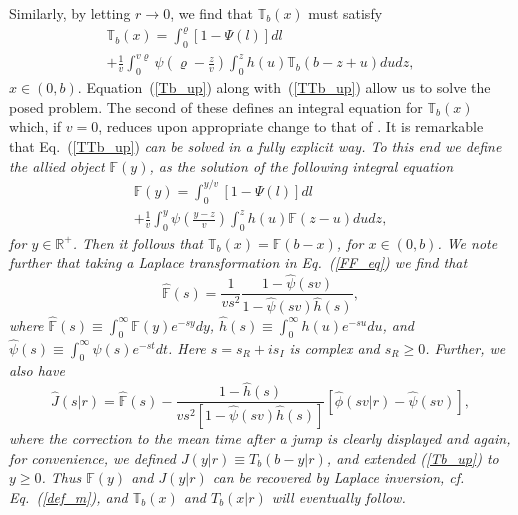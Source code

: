 \documentclass[english,aps,a4paper,twocolumn,showpacs,showkeys,amsfonts,amsmath,amssymb,amscd,nofootinbib]{revtex4}
\newcommand{\1}{\'\i}
\newcommand{\TT}{\mathbb{T}}\newcommand{\FF}{\mathbb{F}}
\newcommand{\RR}{\mathbb{R}}
\def\eq{\equiv}
\begin{document}
 Similarly, by
 letting %
 $r\to 0$, we find that
 $\TT_b(x)$ must satisfy
\begin{eqnarray}
\TT_b(x)= \int^{\varrho}_{0}\left[1-\Psi(l)\right]d  l  \nonumber \\
+\frac{1}{v}\int^{v \varrho}_{0}
\psi\left(\varrho-\frac{z}{v}\right) \int^{z}_{0} h(u)
\TT_b\left(b-z+u\right)d  ud  z, \label{TTb_up}%
\end{eqnarray}
$x\in(0,b)$. Equation~(\ref{Tb_up})  along with~(\ref{TTb_up})  allow us to solve
the posed problem. The second of these
  defines an  integral equation for $\TT_b(x)$ which, if $v=0$,
 reduces upon appropriate change to that  of  \cite{mmp05,mmpw06}.
  It is remarkable that Eq.~(\ref{TTb_up}) \it can be solved in a fully
explicit way. \rm   To this end we define the    allied object
$\FF(y)$, %
as the solution of the following integral
equation
\begin{eqnarray}
\FF(y)= \int^{y/v}_{0}\left[1-\Psi(l)\right]d  l  \nonumber \\
+\frac{1}{v}\int^{y}_{0} \psi\left(\frac{y-z}{v}\right)
\int^{z}_{0} h(u) \FF\left(z-u\right)d  ud  z, \label{FF_eq}%
\end{eqnarray}
for $y\in \RR^{+}$. Then it follows that $\TT_b(x) =\FF(b-x)$, for
$x\in (0,b)$.  We note further that   taking a   Laplace
transformation in   Eq.~(\ref{FF_eq})  we    find that
\begin{equation}
\hat{\FF}(s)= \frac{1}{v s^2}\frac{1-\hat{\psi}(s
v)}{1-\hat{\psi}(s v)\hat{h}(s)}, \label{FF_sol}
\end{equation}
where  $\hat{\FF}(s)\equiv \int^{\infty}_{0} \FF(y) e^{-s y}d y$,
$\hat{h}(s)\equiv \int^{\infty}_{0} h(u) e^{-s u}d  u$, and
$\hat{\psi}(s)\equiv \int^{\infty}_{0} \psi(s) e^{-s t}d  t$. Here
$s=s_R+is_I$ is complex and $s_R\geqslant 0$. Further, we also have
\begin{equation}
\hat{J}(s|r) =  \hat{\FF}(s)-   \frac{ 1- \hat{h}(s) }{v
s^2\left[1-\hat{\psi}(s v)\hat{h}(s)\right]}\left[\hat{\phi}(s
v|r)-\hat{\psi}(s v )\right],\label{hattime}
\end{equation}
where the correction to the mean time after a jump is clearly
displayed and again, for convenience, we defined $J(y|r)\eq T_b(b-y|r)$, and extended (\ref{Tb_up}) to $y\geqslant 0$. Thus ${\FF}(y) $ and $J(y|r)$  can be recovered by
Laplace inversion, cf. Eq.~(\ref{def_m}), and $\TT_b(x)$ and $T_b(x|r)$ will eventually follow.
\end{document}

